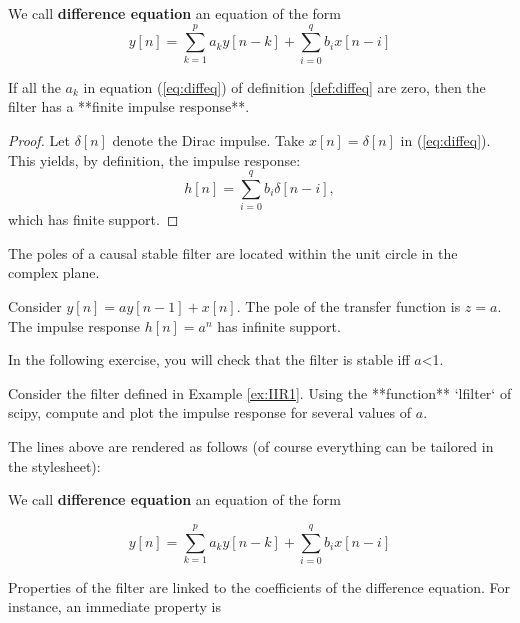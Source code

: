     \begin{listing}
\begin{definition} \label{def:diffeq}
We call \textbf{difference equation} an equation of the form
$$
\label{eq:diffeq}
y[n]= \sum_{k=1}^{p} a_k y[n-k] + \sum_{i=0}^q b_i x[n-i]
$$
\end{definition}

\begin{property}
If all the $a_k$ in equation (\ref{eq:diffeq}) of definition \ref{def:diffeq} are zero, then the filter has a **finite impulse response**. 
\end{property}

\begin{proof}
Let $\delta[n]$ denote the Dirac impulse. Take $x[n]=\delta[n]$ in (\ref{eq:diffeq}). This yields, by definition, the impulse response:
$$
\label{eq:fir}
h[n]= \sum_{i=0}^q b_i \delta[n-i],
$$
which has finite support. 
\end{proof}

\begin{theorem}
The poles of a causal stable filter are located within the unit circle in the complex plane.
\end{theorem}

\begin{example} \label{ex:IIR1}
Consider $y[n]= a y[n-1] +  x[n]$. The pole of the transfer function is $z=a$. The impulse response $h[n]=a^n$ has infinite support.
\end{example}

In the following exercise, you will check that the filter is stable iff $a$<1.

\begin{exercise}\label{ex:exofilter}
Consider the filter defined in Example \ref{ex:IIR1}. Using the **function** `lfilter` of scipy, compute and plot the impulse response for several values of $a$.
\end{exercise}

\end{listing}

    The lines above are rendered as follows (of course everything can be
tailored in the stylesheet):

\begin{definition} \label{def:diffeq}
We call
\textbf{difference equation} an equation of the form


\begin{equation}
\label{eq:diffeq}
y[n]= \sum_{k=1}^{p} a_k y[n-k] + \sum_{i=0}^q b_i x[n-i]
\end{equation}


\end{definition} Properties of the filter are linked to the
coefficients of the difference equation. For instance, an immediate
property is

